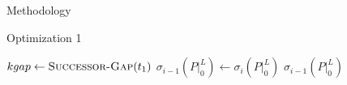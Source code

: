 \documentclass{article}
\begin{document}
\begin{section}{Methodology}
\begin{subsection}{Optimization 1}
\begin{paragraph}{}
\begin{algorithm}[H]
\begin{algorithmic}[2]
                  \ExitWhile
                \EndIf
                      \State \Call{Gap-Insert}{$\sigma_{i}(P|_{0}^{L}), [t_{1},t)$}
                    \NewEndIf
                  \State \Call{Gap-Insert}{$\sigma_{i}(P|_{0}^{L}), [t + C_{j},t_{2})$}
                  \ExitWhile
                \EndIf
                    \State \Call{Gap-Insert}{$\sigma_{i}(P|_{0}^{L}), [t_{1},t)$}
                  \NewEndIf
                \EndIf
              \EndIf
                \State $kgap \gets \Call{Successor-Gap}{t_{1}}$
              \EndIf
            \EndWhile
          \EndFor
          \State $\sigma_{i-1}(P|_{0}^{L}) \gets \sigma_{i}(P|_{0}^{L})$
          \State \Return $\sigma_{i-1}(P|_{0}^{L})$
        \EndFunction
      \end{algorithmic}
    \end{algorithm}
    \end{paragraph}
  \end{subsection}


\end{section}
\end{document}
